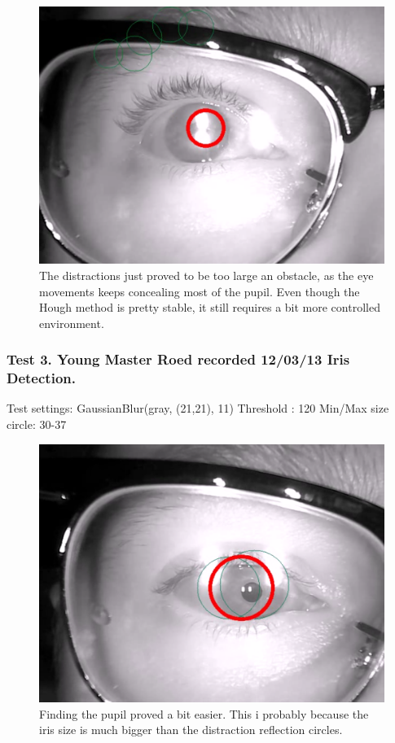 \begin{figure}[htbp]
\centering
\includegraphics{pics/hough/12.png}
\caption{The distractions just proved to be too large an obstacle, as
the eye movements keeps concealing most of the pupil. Even though the
Hough method is pretty stable, it still requires a bit more controlled
environment. \label{hough12}}
\end{figure}

\subsubsection{Test 3. Young Master Roed recorded 12/03/13 Iris
Detection.}

Test settings: GaussianBlur(gray, (21,21), 11) Threshold : 120 Min/Max
size circle: 30-37

\begin{figure}[htbp]
\centering
\includegraphics{pics/hough/13.png}
\caption{Finding the pupil proved a bit easier. This i probably because
the iris size is much bigger than the distraction reflection circles.
\label{hough13}}
\end{figure}

